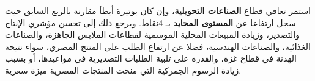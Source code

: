 استمر تعافي قطاع \textbf{الصناعات التحويلية}، وإن كان بوتيرة أبطأ مقارنة بالربع السابق حيث سجل ارتفاعا عن \textbf{المستوى المحايد} بـ 4نقاط. ويرجع ذلك إلى تحسن مؤشري الإنتاج والتصدير، وزيادة المبيعات المحلية الموسمية لقطاعات الملابس الجاهزة، والصناعات الغذائية، والصناعات الهندسية، فضلا عن ارتفاع الطلب على المنتج المصري، سواء نتيجة الهدنة في قطاع غزة، والقدرة على تلبية الطلبات التصديرية في مواعيدها، أو بسبب زيادة الرسوم الجمركية التي منحت المنتجات المصرية ميزة سعرية.
